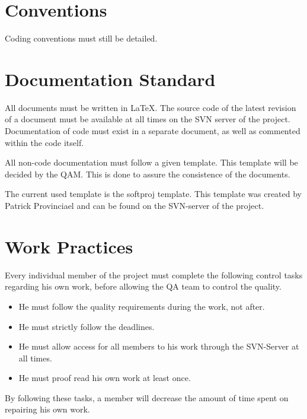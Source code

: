 \documentclass[salesmen, twoside]{../../../templates/latex/2009/softproj}
\begin{document}
\begin{projdoc}
\section{Conventions}
Coding conventions must still be detailed.

\section{Documentation Standard}
All documents must be written in LaTeX. The source code of the latest revision of a document must be available at all times on the SVN server of the project. Documentation of code must exist in a separate document, as well as commented within the code itself.

All non-code documentation must follow a given template. This template will be decided by the QAM. This is done to assure the consistence of the documents.

The current used template is the softproj template. This template was created by Patrick Provinciael and can be found on the SVN-server of the project.

\section{Work Practices}
Every individual member of the project must complete the following control tasks regarding his own work, before allowing the QA team to control the quality.
\begin{itemize}
\item He must follow the quality requirements during the work, not after.
\item He must strictly follow the deadlines.
\item He must allow access for all members to his work through the SVN-Server at all times.
\item He must proof read his own work at least once.
\end{itemize}
By following these tasks, a member will decrease the amount of time spent on repairing his own work.


\end{projdoc}
\end{document}
